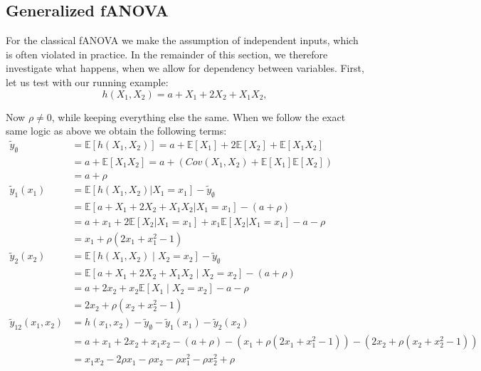 \subsection{Generalized fANOVA}
For the classical fANOVA we make the assumption of independent inputs, which is often violated in practice. In the remainder of this section, we therefore investigate what happens, when we allow for dependency between variables. First, let us test with our running example:
\[
h(X_1, X_2) = a + X_1 + 2X_2 + X_1 X_2,
\]

Now $\rho\neq 0$, while keeping everything else the same. When we follow the exact same logic as above we obtain the following terms:
\begin{align*}
\tilde{y}_{\emptyset} &= \mathbb{E}[h(X_1, X_2)] 
= a + \mathbb{E}[X_1] + 2\mathbb{E}[X_2] + \mathbb{E}[X_1 X_2] \\
&= a + \mathbb{E}[X_1 X_2] 
= a + \left( Cov(X_1, X_2) + \mathbb{E}[X_1]\mathbb{E}[X_2] \right) \\
&= a + \rho \\
\tilde{y}_1(x_1) 
&= \mathbb{E}[h(X_1, X_2) | X_1 = x_1] - \tilde{y}_{\emptyset} \\
&= \mathbb{E}[a + X_1 + 2X_2 + X_1 X_2 | X_1 = x_1] - (a + \rho) \\
&= a + x_1 + 2\mathbb{E}[X_2 | X_1 = x_1] + x_1 \mathbb{E}[X_2 | X_1 = x_1] - a - \rho \\
&= x_1 + \rho(2x_1 + x_1^2 - 1) \\
\tilde{y}_2(x_2) 
&= \mathbb{E}[h(X_1, X_2) \mid X_2 = x_2] - \tilde{y}_{\emptyset} \\
&= \mathbb{E}[a + X_1 + 2X_2 + X_1 X_2 \mid X_2 = x_2] - (a + \rho) \\
&= a + 2x_2 + x_2 \mathbb{E}[X_1 \mid X_2 = x_2] - a - \rho \\
&= 2x_2 + \rho(x_2 + x_2^2 - 1) \\
\tilde{y}_{12}(x_1, x_2) 
&= h(x_1, x_2) - \tilde{y}_{\emptyset} - \tilde{y}_1(x_1) - \tilde{y}_2(x_2) \\
&= a + x_1 + 2x_2 + x_1 x_2 - (a + \rho) - (x_1 + \rho(2x_1 + x_1^2 - 1)) - (2x_2 + \rho(x_2 + x_2^2 - 1))\\
&= x_1 x_2 - 2\rho x_1 - \rho x_2  - \rho x_1^2  - \rho x_2^2 + \rho
\end{align*}

